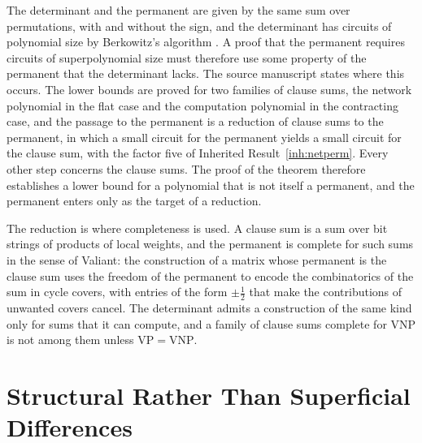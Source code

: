 \documentclass[11pt,letterpaper]{report}
\theoremstyle{plain}
\theoremstyle{definition}
\theoremstyle{remark}
\newcommand{\VP}{\mathrm{VP}}
\newcommand{\VNP}{\mathrm{VNP}}
\begin{document}
The determinant and the permanent are given by the same sum over permutations, with and without the sign, and the determinant has circuits of polynomial size by Berkowitz's algorithm \cite{Berkowitz1984}. A proof that the permanent requires circuits of superpolynomial size must therefore use some property of the permanent that the determinant lacks. The source manuscript states where this occurs. The lower bounds are proved for two families of clause sums, the network polynomial in the flat case and the computation polynomial in the contracting case, and the passage to the permanent is a reduction of clause sums to the permanent, in which a small circuit for the permanent yields a small circuit for the clause sum, with the factor five of Inherited Result~\ref{inh:netperm}. Every other step concerns the clause sums. The proof of the theorem therefore establishes a lower bound for a polynomial that is not itself a permanent, and the permanent enters only as the target of a reduction.

The reduction is where completeness is used. A clause sum is a sum over bit strings of products of local weights, and the permanent is complete for such sums in the sense of Valiant: the construction of a matrix whose permanent is the clause sum uses the freedom of the permanent to encode the combinatorics of the sum in cycle covers, with entries of the form $\pm\tfrac12$ that make the contributions of unwanted covers cancel. The determinant admits a construction of the same kind only for sums that it can compute, and a family of clause sums complete for $\VNP$ is not among them unless $\VP=\VNP$.

\section{Structural Rather Than Superficial Differences}
\end{document}
